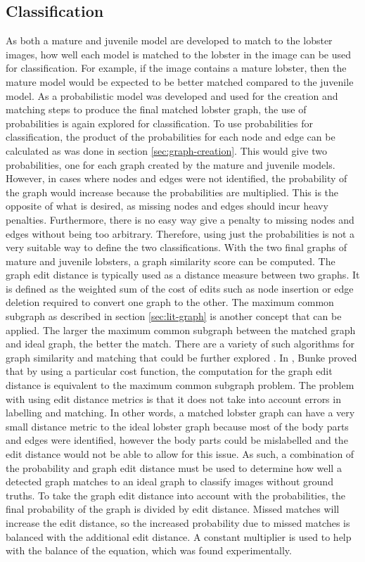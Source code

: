 \subsection{Classification}
As both a mature and juvenile model are developed to match to the lobster images, how well each model is matched to the lobster in the image can be used for classification. For example, if the image contains a mature lobster, then the mature model would be expected to be better matched compared to the juvenile model. 
\n
As a probabilistic model was developed and used for the creation and matching steps to produce the final matched lobster graph, the use of probabilities is again explored for classification. To use probabilities for classification, the product of the probabilities for each node and edge can be calculated as was done in section \ref{sec:graph-creation}. This would give two probabilities, one for each graph created by the mature and juvenile models. However, in cases where nodes and edges were not identified, the probability of the graph would increase because the probabilities are multiplied. This is the opposite of what is desired, as missing nodes and edges should incur heavy penalties. Furthermore, there is no easy way give a penalty to missing nodes and edges without being too arbitrary. Therefore, using just the probabilities is not a very suitable way to define the two classifications.
\n
With the two final graphs of mature and juvenile lobsters, a graph similarity score can be computed. The graph edit distance is typically used as a distance measure between two graphs. It is defined as the weighted sum of the cost of edits such as node insertion or edge deletion required to convert one graph to the other. The maximum common subgraph as described in section \ref{sec:lit-graph} is another concept that can be applied. The larger the maximum common subgraph between the matched graph and ideal graph, the better the match. There are a variety of such algorithms for graph similarity and matching that could be further explored \cite{graph-similarity}. In \cite{graph-edit}, Bunke proved that by using a particular cost function, the computation for the graph edit distance is equivalent to the maximum common subgraph problem. The problem with using edit distance metrics is that it does not take into account errors in labelling and matching. In other words, a matched lobster graph can have a very small distance metric to the ideal lobster graph because most of the body parts and edges were identified, however the body parts could be mislabelled and the edit distance would not be able to allow for this issue. 
\n
As such, a combination of the probability and graph edit distance must be used to determine how well a detected graph matches to an ideal graph to classify images without ground truths. To take the graph edit distance into account with the probabilities, the final probability of the graph is divided by edit distance. Missed matches will increase the edit distance, so the increased probability due to missed matches is balanced with the additional edit distance. A constant multiplier is used to help with the balance of the equation, which was found experimentally.

